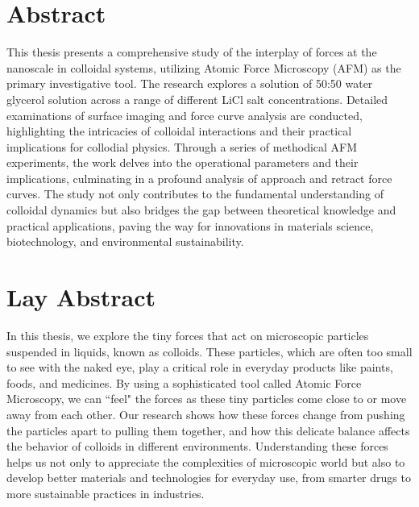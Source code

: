 \section{Abstract}

This thesis presents a comprehensive study of the interplay of forces at the nanoscale in colloidal systems, utilizing Atomic Force Microscopy (AFM) as the primary investigative tool. The research explores a solution of 50:50 water glycerol solution across a range of different LiCl salt concentrations. Detailed examinations of surface imaging and force curve analysis are conducted, highlighting the intricacies of colloidal interactions and their practical implications for collodial physics. Through a series of methodical AFM experiments, the work delves into the operational parameters and their implications, culminating in a profound analysis of approach and retract force curves. The study not only contributes to the fundamental understanding of colloidal dynamics but also bridges the gap between theoretical knowledge and practical applications, paving the way for innovations in materials science, biotechnology, and environmental sustainability.

\section{Lay Abstract}

In this thesis, we explore the tiny forces that act on microscopic particles suspended in liquids, known as colloids. These particles, which are often too small to see with the naked eye, play a critical role in everyday products like paints, foods, and medicines. By using a sophisticated tool called Atomic Force Microscopy, we can ``feel" the forces as these tiny particles come close to or move away from each other. Our research shows how these forces change from pushing the particles apart to pulling them together, and how this delicate balance affects the behavior of colloids in different environments. Understanding these forces helps us not only to appreciate the complexities of microscopic world but also to develop better materials and technologies for everyday use, from smarter drugs to more sustainable practices in industries.